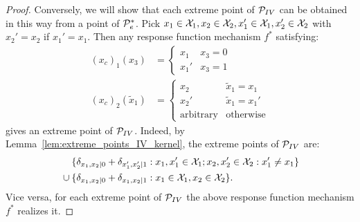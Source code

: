 \begin{proof}
  Conversely, we will show that each extreme point of $\mathcal{P}_{IV}$ can be obtained in this way from a point of $\mathcal{P}_e^*$.
  Pick $x_1 \in \mathcal{X}_1,x_2 \in \mathcal{X}_2,x_1' \in \mathcal{X}_1,x_2' \in \mathcal{X}_2$ with $x_2'=x_2$ if $x_1'=x_1$.
  Then any response function mechanism $f^*$ satisfying:
  \begin{align*}
    (x_c)_1(x_3) &= \begin{cases} x_1 & x_3=0 \\ x_1' & x_3=1 \end{cases} \\
      (x_c)_2(\tilde{x}_1) &= \begin{cases} x_2 & \tilde{x}_1=x_1 \\ x_2' & \tilde{x}_1=x_1' \\ \text{arbitrary} & \text{otherwise} \end{cases}
  \end{align*}
  gives an extreme point of $\mathcal{P}_{IV}$. Indeed, by Lemma~\ref{lem:extreme_points_IV_kernel}, the extreme points of $\mathcal{P}_{IV}$ are:
  \begin{equation*}\begin{split}
    & \phantom{{} \cup {}}\{\delta_{x_1,x_2|0} + \delta_{x_1',x_2'|1} : x_1,x_1' \in \CX_1; x_2,x_2' \in \CX_2 : x_1' \ne x_1\} \\
    & {} \cup \{\delta_{x_1,x_2|0} + \delta_{x_1,x_2|1} : x_1 \in \CX_1, x_2 \in \CX_2\}.
  \end{split}\end{equation*}
  Vice versa, for each extreme point of $\mathcal{P}_{IV}$ the above response function mechanism $f^*$ realizes it.
\end{proof}

